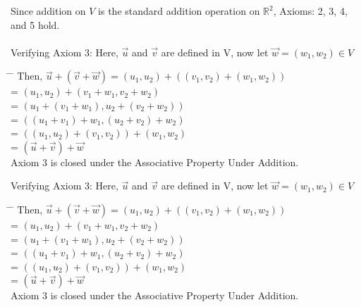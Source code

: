 \documentclass[addpoints]{exam}
\begin{document}
\begin{tcolorbox}[colback=cyan!5!white,colframe=cyan!75!black,title=1. c) Solution Continued]
Since addition on $V$ is the standard addition operation on $\mathbb{R}^2$, Axioms: 2, 3, 4, and 5 hold.\\ \\
%
Verifying Axiom 3: \space \space \space Here, $\vec{u}$ and $\vec{v}$ are defined in V, now let $\vec{w}=(w_1,w_2) \in V$      
\begin{tabbing}
\hspace*{10em}\= \hspace*{2em} \= \kill %
    \>   Then, $\vec{u}+(\vec{v}+\vec{w}) = (u_1, u_2) +((v_1,v_2)+(w_1,w_2))$\\
    \> \hspace{7.9em} =  $(u_1, u_2) +(v_1+w_1,v_2+w_2)$  \\
    \> \hspace{7.9em} =  $(u_1+(v_1+w_1),u_2 +(v_2+w_2))$ \\
    \> \hspace{7.9em} =  $((u_1+v_1)+w_1,(u_2+v_2)+w_2)$ \\
    \> \hspace{7.9em} =  $((u_1,u_2)+(v_1,v_2))+(w_1,w_2)$ \\
    \> \hspace{7.9em} =  $(\vec{u}+\vec{v})+\vec{w}$ \\
    Axiom 3 is closed under the Associative Property Under Addition.
\end{tabbing}
%
Verifying Axiom 3: \space \space \space Here, $\vec{u}$ and $\vec{v}$ are defined in V, now let $\vec{w}=(w_1,w_2) \in V$      
\begin{tabbing}
\hspace*{10em}\= \hspace*{2em} \= \kill %
    \>   Then, $\vec{u}+(\vec{v}+\vec{w}) = (u_1, u_2) +((v_1,v_2)+(w_1,w_2))$\\
    \> \hspace{7.9em} =  $(u_1, u_2) +(v_1+w_1,v_2+w_2)$  \\
    \> \hspace{7.9em} =  $(u_1+(v_1+w_1),u_2 +(v_2+w_2))$ \\
    \> \hspace{7.9em} =  $((u_1+v_1)+w_1,(u_2+v_2)+w_2)$ \\
    \> \hspace{7.9em} =  $((u_1,u_2)+(v_1,v_2))+(w_1,w_2)$ \\
    \> \hspace{7.9em} =  $(\vec{u}+\vec{v})+\vec{w}$ \\
    Axiom 3 is closed under the Associative Property Under Addition.
\end{tabbing}
%
\end{tcolorbox}
\end{document}
